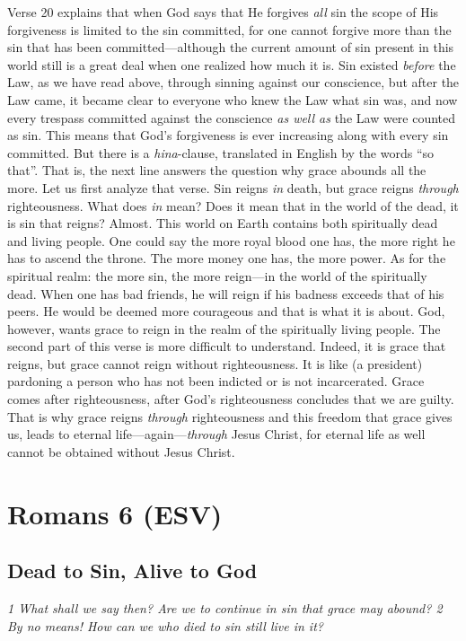 Verse 20 explains that when God says that He forgives \emph{all} sin the
scope of His forgiveness is limited to the sin committed, for one cannot
forgive more than the sin that has been committed---although the current
amount of sin present in this world still is a great deal when one
realized how much it is. Sin existed \emph{before} the Law, as we have
read above, through sinning against our conscience, but after the Law
came, it became clear to everyone who knew the Law what sin was, and now
every trespass committed against the conscience \emph{as well as} the
Law were counted as sin. This means that God's forgiveness is ever
increasing along with every sin committed. But there is a
\emph{hina}-clause, translated in English by the words ``so that''. That
is, the next line answers the question why grace abounds all the more.
Let us first analyze that verse. Sin reigns \emph{in} death, but grace
reigns \emph{through} righteousness. What does \emph{in} mean? Does it
mean that in the world of the dead, it is sin that reigns? Almost. This
world on Earth contains both spiritually dead and living people. One
could say the more royal blood one has, the more right he has to ascend
the throne. The more money one has, the more power. As for the spiritual
realm: the more sin, the more reign---in the world of the spiritually
dead. When one has bad friends, he will reign if his badness exceeds
that of his peers. He would be deemed more courageous and that is what
it is about. God, however, wants grace to reign in the realm of the
spiritually living people. The second part of this verse is more
difficult to understand. Indeed, it is grace that reigns, but grace
cannot reign without righteousness. It is like (a president) pardoning a
person who has not been indicted or is not incarcerated. Grace comes
after righteousness, after God's righteousness concludes that we are
guilty. That is why grace reigns \emph{through} righteousness and this
freedom that grace gives us, leads to eternal
life---again---\emph{through} Jesus Christ, for eternal life as well
cannot be obtained without Jesus Christ.



\hypertarget{romans-6-esv}{%
\section{Romans 6 (ESV)}\label{romans-6-esv}}
\vspace{10.5cm}
\subsection{Dead to Sin, Alive to God} \emph{1 What shall we say then? Are
we to continue in sin that grace may abound? 2 By no means! How can we
who died to sin still live in it?}

